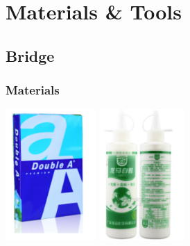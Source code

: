 \section{Materials \& Tools}
\subsection{Bridge}
\subsubsection{Materials}


\newcommand{\beginMyTabular}{
    \begin{center}
    \begin{tabular}{p{0.4cm}p{5cm}p{7cm}rr}
    \hline
    No. & Item & Specification & Quantity & Price(Yuan) \\
    \hline
}
\newcommand{\MyTabularEnd}{
    \hline
    \end{tabular}
    \end{center}
}

\setcounter{matcnt}{0}
\newcommand{\CounterOfM}{\stepcounter{matcnt}\arabic{matcnt}}
%

\begin{center}
\includegraphics[height=5cm]{picture/material/a4paper}
\includegraphics[height=5cm]{picture/material/whiteglue}
\end{center}

